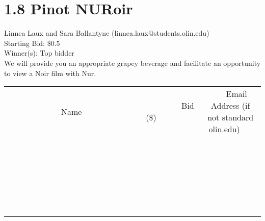 \documentclass[11pt]{article}
\begin{document}
\section*{1.8 Pinot NURoir}
Linnea Laux and Sara Ballantyne (linnea.laux@students.olin.edu) \\
Starting Bid: \$0.5 \\
Winner(s): 
Top bidder \\
We will provide you an appropriate grapey beverage and facilitate an opportunity to view a Noir film with Nur. \\[6ex]
\begin{tabular}{c c c}
~~~~~~~~~~~~~Name~~~~~~~~~~~~~ & ~~~~~~~~~Bid (\$)~~~~~~~~~ & ~~~Email Address (if not standard olin.edu)~~~ \\
 & & \\
\hline
 & & \\
\hline
 & & \\
\hline
 & & \\
\hline
 & & \\
\hline
 & & \\
\hline
 & & \\
\hline
 & & \\
\hline
 & & \\
\hline
 & & \\
\hline
 & & \\
\hline
 & & \\
\hline
 & & \\
\hline
 & & \\
\hline
 & & \\
\hline
 & & \\
\hline
 & & \\
\hline
 & & \\
\hline
 & & \\
\hline
 & & \\
\hline
 & & \\
\hline
 & & \\
\hline
 & & \\
\hline
 & & \\
\hline
 & & \\
\hline
 & & \\
\hline
\end{tabular}
\clearpage
\end{document}

